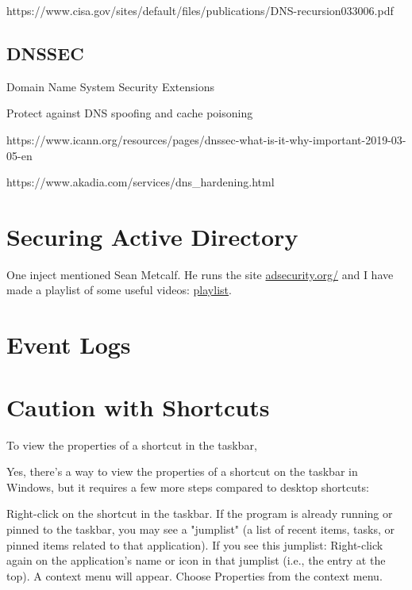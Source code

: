 \documentclass{article}
\begin{document}
https://www.cisa.gov/sites/default/files/publications/DNS-recursion033006.pdf

\subsection{DNSSEC}
Domain Name System Security Extensions

Protect against DNS spoofing and cache poisoning

https://www.icann.org/resources/pages/dnssec-what-is-it-why-important-2019-03-05-en

https://www.akadia.com/services/dns\_hardening.html

\section{Securing Active Directory}

One inject mentioned Sean Metcalf.
He runs the site \href{https://adsecurity.org/}{adsecurity.org/}
and I have made a playlist of some useful videos: \href{https://www.youtube.com/playlist?list=PLHkV-wwoQ7s_7vUau-eqiscWoZZNC3EcZ}{playlist}.

\section{Event Logs}

\section{Caution with Shortcuts}
To view the properties of a shortcut in the taskbar, 

Yes, there's a way to view the properties of a shortcut on the taskbar in Windows, but it requires a few more steps compared to desktop shortcuts:

    Right-click on the shortcut in the taskbar.
    If the program is already running or pinned to the taskbar, you may see a "jumplist" (a list of recent items, tasks, or pinned items related to that application). If you see this jumplist:
        Right-click again on the application's name or icon in that jumplist (i.e., the entry at the top).
    A context menu will appear. Choose Properties from the context menu.
\end{document}
